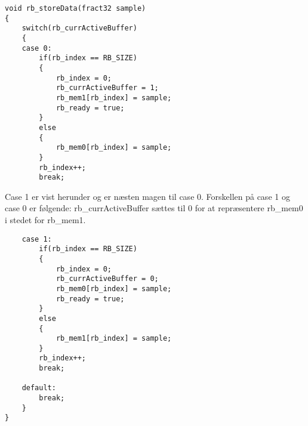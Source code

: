 \begin{verbatim}
void rb_storeData(fract32 sample)
{
	switch(rb_currActiveBuffer)
	{
	case 0:
		if(rb_index == RB_SIZE)
		{
			rb_index = 0;
			rb_currActiveBuffer = 1;
			rb_mem1[rb_index] = sample;
			rb_ready = true;
		}
		else
		{
			rb_mem0[rb_index] = sample;
		}
		rb_index++;
		break;
\end{verbatim}

Case 1 er vist herunder og er næsten magen til case 0. Forskellen på case 1 og case 0 er følgende: 
rb\_currActiveBuffer sættes til 0 for at repræsentere rb\_mem0 i stedet for rb\_mem1. 

\begin{verbatim}
	case 1:
		if(rb_index == RB_SIZE)
		{
			rb_index = 0;
			rb_currActiveBuffer = 0;
			rb_mem0[rb_index] = sample;
			rb_ready = true;
		}
		else
		{
			rb_mem1[rb_index] = sample;
		}
		rb_index++;
		break;

	default:
		break;
	}
}

\end{verbatim}





